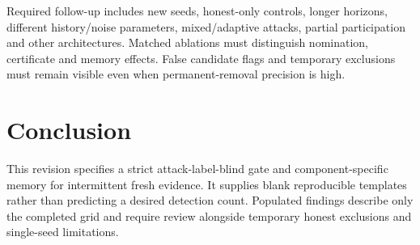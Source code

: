 \documentclass[conference]{IEEEtran}
\begin{document}
Required follow-up includes new seeds, honest-only controls, longer horizons,
different history/noise parameters, mixed/adaptive attacks, partial participation
and other architectures. Matched ablations must distinguish nomination,
certificate and memory effects. False candidate flags and temporary exclusions
must remain visible even when permanent-removal precision is high.

\section{Conclusion}
This revision specifies a strict attack-label-blind gate and component-specific
memory for intermittent fresh evidence. It supplies blank reproducible templates
rather than predicting a desired detection count. Populated findings describe
only the completed grid and require review alongside temporary honest exclusions
and single-seed limitations.


\end{document}
